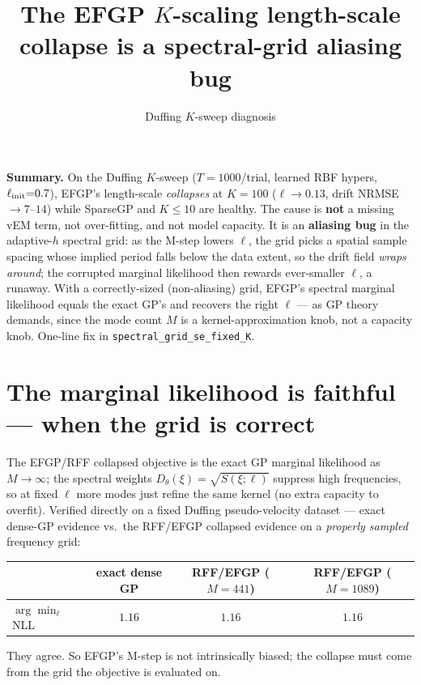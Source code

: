 \documentclass[11pt]{article}
\title{\textbf{The EFGP $K$-scaling length-scale collapse is a spectral-grid
aliasing bug}}
\author{Duffing $K$-sweep diagnosis}
\date{}
\newcommand{\code}[1]{\texttt{#1}}
\begin{document}
\maketitle

\noindent\textbf{Summary.} On the Duffing $K$-sweep ($T{=}1000$/trial, learned
RBF hypers, $\ell_{\rm init}{=}0.7$), EFGP's length-scale \emph{collapses} at
$K{=}100$ ($\ell{\to}0.13$, drift NRMSE ${\to}7$--$14$) while SparseGP and
$K{\le}10$ are healthy. The cause is \textbf{not} a missing vEM term, not
over-fitting, and not model capacity. It is an \textbf{aliasing bug} in the
adaptive-$h$ spectral grid: as the M-step lowers $\ell$, the grid picks a spatial
sample spacing whose implied period falls below the data extent, so the drift
field \emph{wraps around}; the corrupted marginal likelihood then rewards
ever-smaller $\ell$, a runaway. With a correctly-sized (non-aliasing) grid,
EFGP's spectral marginal likelihood equals the exact GP's and recovers the right
$\ell$ --- as GP theory demands, since the mode count $M$ is a kernel-approximation
knob, not a capacity knob. One-line fix in \code{spectral\_grid\_se\_fixed\_K}.

\section{The marginal likelihood is faithful --- when the grid is correct}
The EFGP/RFF collapsed objective is the exact GP marginal likelihood as
$M\to\infty$; the spectral weights $D_\theta(\xi){=}\sqrt{S(\xi;\ell)}$
suppress high frequencies, so at fixed $\ell$ more modes just refine the same
kernel (no extra capacity to overfit). Verified directly on a fixed Duffing
pseudo-velocity dataset --- exact dense-GP evidence vs.\ the RFF/EFGP collapsed
evidence on a \emph{properly sampled} frequency grid:
\begin{center}\small
\begin{tabular}{@{}lccc@{}}
\toprule
 & exact dense GP & RFF/EFGP ($M{=}441$) & RFF/EFGP ($M{=}1089$) \\
\midrule
$\arg\min_\ell$ NLL & $1.16$ & $1.16$ & $1.16$ \\
\bottomrule
\end{tabular}
\end{center}
They agree. So EFGP's M-step is not intrinsically biased; the collapse must come
from the grid the objective is evaluated on.
\end{document}
